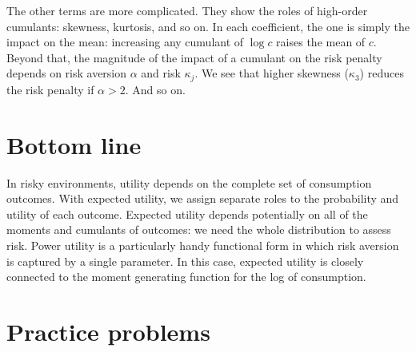 \documentclass[11pt]{article}
\begin{document}
The other terms are more complicated.
They show the roles of high-order cumulants:  skewness, kurtosis, and so on.
In each coefficient, the one is simply the impact on the mean:
increasing any cumulant of $\log c$ raises the mean of $c$.
Beyond that, the magnitude of the impact of a cumulant
on the risk penalty depends on risk aversion $\alpha$ and risk $\kappa_j$.
We see that higher skewness ($\kappa_3$) reduces the risk penalty if $\alpha > 2$.
And so on.


\section*{Bottom line}

In risky environments, utility depends
on the complete set of consumption outcomes.
With expected utility, we assign separate roles to the probability
and utility of each outcome.
Expected utility depends potentially on all of the moments and cumulants
of outcomes:
we need the whole distribution to assess risk.
Power utility is a particularly handy functional form
in which risk aversion is captured by a single parameter.
In this case, expected utility is closely connected to the
moment generating function for the log of consumption.

\section*{Practice problems}
\end{document}
